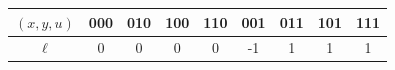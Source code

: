 \documentclass{article}
\newcommand{\E}{\mathbb{E}}
\begin{document}

\begin{center}
\begin{tabular}
{ |c|c|c|c|c|c|c|c|c| }
\hline
 $(x,y,u)$ & 000 & 010 & 100 & 110 & 001 & 011 & 101 & 111\\ 
 \hline
 $\ell$ & 0 & 0 & 0 & 0 & -1 & 1 & 1 & 1 \\  
 \hline
\end{tabular}
\end{center}

\end{document}
